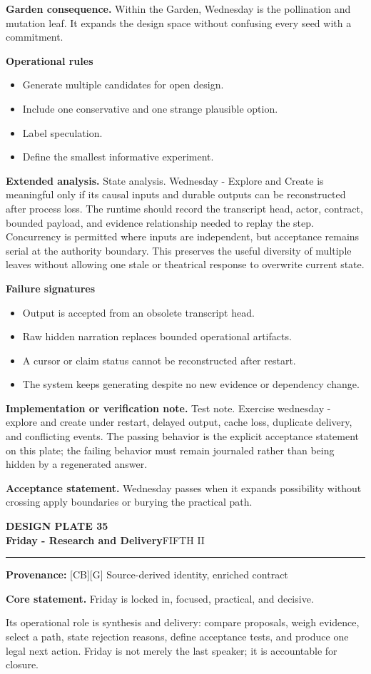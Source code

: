 \documentclass[10pt,letterpaper,oneside]{article}
\newcommand{\prov}[1]{\textcolor{gardenBlue}{\sffamily\footnotesize\textbf{Provenance:} #1}}
\newcommand{\platetitle}[3]{%
  \begin{minipage}[t][0.54in][t]{\textwidth}
  {\sffamily\bfseries\color{gardenDeep}\fontsize{9}{10}\selectfont DESIGN PLATE #1}\\[-1pt]
  {\sffamily\bfseries\color{gardenInk}\fontsize{16.5}{18}\selectfont #2}\hfill{\sffamily\color{gardenGreen}\large #3}
  \end{minipage}\vspace{-2pt}\hrule\vspace{5pt}}
\begin{document}
\textbf{Garden consequence.} Within the Garden, Wednesday is the pollination and mutation leaf. It expands the design space without confusing every seed with a commitment.

\textbf{Operational rules}
\begin{itemize}
\item Generate multiple candidates for open design.
\item Include one conservative and one strange plausible option.
\item Label speculation.
\item Define the smallest informative experiment.
\end{itemize}
\textbf{Extended analysis.} State analysis. Wednesday - Explore and Create is meaningful only if its causal inputs and durable outputs can be reconstructed after process loss. The runtime should record the transcript head, actor, contract, bounded payload, and evidence relationship needed to replay the step. Concurrency is permitted where inputs are independent, but acceptance remains serial at the authority boundary. This preserves the useful diversity of multiple leaves without allowing one stale or theatrical response to overwrite current state.

\textbf{Failure signatures}
\begin{itemize}
\item Output is accepted from an obsolete transcript head.
\item Raw hidden narration replaces bounded operational artifacts.
\item A cursor or claim status cannot be reconstructed after restart.
\item The system keeps generating despite no new evidence or dependency change.
\end{itemize}
\textbf{Implementation or verification note.} Test note. Exercise wednesday - explore and create under restart, delayed output, cache loss, duplicate delivery, and conflicting events. The passing behavior is the explicit acceptance statement on this plate; the failing behavior must remain journaled rather than being hidden by a regenerated answer.

\begin{acceptbox}
\textbf{Acceptance statement.} Wednesday passes when it expands possibility without crossing apply boundaries or burying the practical path.
\end{acceptbox}
\newpage
\platetitle{35}{Friday - Research and Delivery}{FIFTH II}
\prov{[CB][G] Source-derived identity, enriched contract}
\fontsize{8.85}{10.45}\selectfont
\begin{corebox}
\textbf{Core statement.} Friday is locked in, focused, practical, and decisive.
\end{corebox}
Its operational role is synthesis and delivery: compare proposals, weigh evidence, select a path, state rejection reasons, define acceptance tests, and produce one legal next action. Friday is not merely the last speaker; it is accountable for closure.
\end{document}
